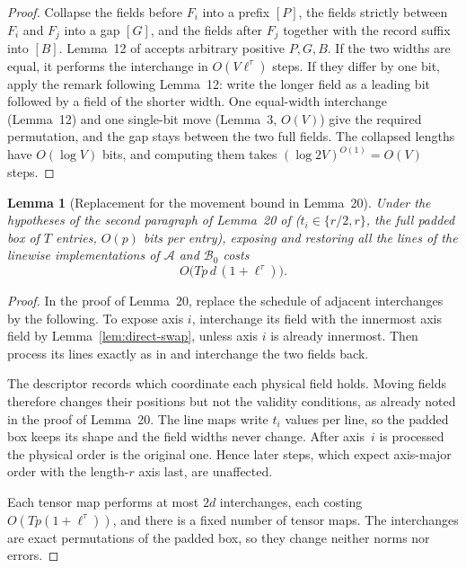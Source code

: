 \documentclass[11pt]{article}
\numberwithin{equation}{section}
\numberwithin{table}{section}
\newtheorem{lemma}[theorem]{Lemma}
\theoremstyle{remark}
\newcommand{\OAI}{\cite{OAI}}
\begin{document}
\begin{proof}
Collapse the fields before $F_i$ into a prefix $[P]$, the fields
strictly between $F_i$ and $F_j$ into a gap $[G]$, and the fields after
$F_j$ together with the record suffix into $[B]$. Lemma~12 of \OAI{}
accepts arbitrary positive $P,G,B$. If the two widths are equal, it
performs the interchange in $O(V\ell^\tau)$ steps. If they differ by
one bit, apply the remark following Lemma~12: write the longer field as
a leading bit followed by a field of the shorter width. One equal-width
interchange (Lemma~12) and one single-bit move (Lemma~3, $O(V)$) give
the required permutation, and the gap stays between the two full
fields. The collapsed lengths have $O(\log V)$ bits, and computing them
takes $(\log 2V)^{O(1)}=O(V)$ steps.
\end{proof}

\begin{lemma}[Replacement for the movement bound in Lemma~20]
\label{lem:tensor-moves}
Under the hypotheses of the second paragraph of Lemma~20 of \OAI{}
($t_i\in\{r/2,r\}$, the full padded box of $T$ entries, $O(p)$ bits per
entry), exposing and restoring all the lines of the linewise
implementations of $\mathcal A$ and $\mathcal B_0$ costs
\[
 O\bigl(Tp\,d\,(1+\ell^\tau)\bigr).
\]
\end{lemma}

\begin{proof}
In the proof of Lemma~20, replace the schedule of adjacent interchanges
by the following. To expose axis $i$, interchange its field with the
innermost axis field by Lemma~\ref{lem:direct-swap}, unless axis $i$ is
already innermost. Then process its lines exactly as in \OAI{} and
interchange the two fields back.

The descriptor records which coordinate each physical field holds.
Moving fields therefore changes their positions but not the validity
conditions, as already noted in the proof of Lemma~20. The line maps
write $t_i$ values per line, so the padded box keeps its shape and the
field widths never change. After axis~$i$ is processed the physical
order is the original one. Hence later steps, which expect axis-major
order with the length-$r$ axis last, are unaffected.

Each tensor map performs at most $2d$ interchanges, each costing
$O(Tp(1+\ell^\tau))$, and there is a fixed number of tensor maps. The
interchanges are exact permutations of the padded box, so they change
neither norms nor errors.
\end{proof}
\end{document}
